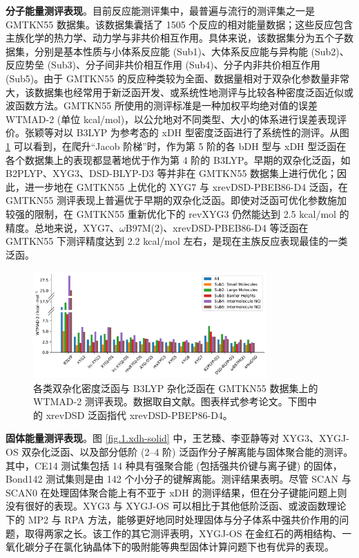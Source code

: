 \textbf{分子能量测评表现}。目前反应能测评集中，最普遍与流行的测评集之一是 GMTKN55 数据集\cite{Goerigk-Grimme.PCCP.2017}。该数据集囊括了 1505 个反应的相对能量数据；这些反应包含主族化学的热力学、动力学与非共价相互作用。具体来说，该数据集分为五个子数据集，分别是基本性质与小体系反应能 (Sub1)、大体系反应能与异构能 (Sub2)、反应势垒 (Sub3)、分子间非共价相互作用 (Sub4)、分子内非共价相互作用 (Sub5)。由于 GMTKN55 的反应种类较为全面、数据量相对于双杂化参数量非常大，该数据集也经常用于新泛函开发、或系统性地测评与比较各种密度泛函近似或波函数方法。GMTKN55 所使用的测评标准是一种加权平均绝对值的误差 WTMAD-2 (单位 kcal/mol)，以公允地对不同类型、大小的体系进行误差表现评价。张颖等对以 B3LYP 为参考态的 xDH 型密度泛函进行了系统性的测评\cite{Zhang-Xu.JPCL.2021}。从图 \ref{fig.1.xdh-b3lyp-wtmad} 可以看到，在爬升“Jacob 阶梯”时，作为第 5 阶的各 bDH 型与 xDH 型泛函在各个数据集上的表现都显著地优于作为第 4 阶的 B3LYP。早期的双杂化泛函，如 B2PLYP、XYG3、DSD-BLYP-D3 等并非在 GMTKN55 数据集上进行优化；因此，进一步地在 GMTKN55 上优化的 XYG7 与 xrevDSD-PBEB86-D4 泛函，在 GMTKN55 测评表现上普遍优于早期的双杂化泛函。即使对泛函可优化参数施加较强的限制，在 GMTKN55 重新优化下的 revXYG3 仍然能达到 2.5 kcal/mol 的精度。总地来说，XYG7、$\omega$B97M(2)、xrevDSD-PBEB86-D4 等泛函在 GMTKN55 下测评精度达到 2.2 kcal/mol 左右，是现在主族反应表现最佳的一类泛函。

\begin{figure}[h]
  \centering
  \includegraphics[width=0.8\textwidth]{assets/xdh-b3lyp-wtmad.pdf}
  \caption{各类双杂化密度泛函与 B3LYP 杂化泛函在 GMTKN55 数据集上的 WTMAD-2 测评表现。数据取自文献\cite{Zhang-Xu.JPCL.2021}。图表样式参考论文\cite{Yan.Thesis.2022}。下图中的 xrevDSD 泛函指代 xrevDSD-PBEP86-D4。}
  \label{fig.1.xdh-b3lyp-wtmad}
\end{figure}

\textbf{固体能量测评表现}。图 \ref{fig.1.xdh-solid} 中，王艺臻、李亚静等对 XYG3、XYGJ-OS 双杂化泛函、以及部分低阶 (2--4 阶) 泛函作分子解离能与固体聚合能的测评\cite{Wang-Xu.JA.2021}。其中，CE14 测试集包括 14 种具有强聚合能 (包括强共价键与离子键) 的固体，Bond142 测试集则是由 142 个小分子的键解离能。测评结果表明。尽管 SCAN 与 SCAN0 在处理固体聚合能上有不亚于 xDH 的测评结果，但在分子键能问题上则没有很好的表现。XYG3 与 XYGJ-OS 可以相比于其他低阶泛函、或波函数理论下的 MP2 与 RPA 方法，能够更好地同时处理固体与分子体系中强共价作用的问题，取得两家之长。该工作的其它测评表明，XYGJ-OS 在金红石的两相结构、一氧化碳分子在氯化钠晶体下的吸附能等典型固体计算问题下也有优异的表现。

